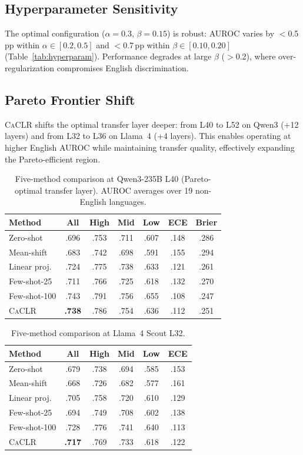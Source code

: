 \documentclass[11pt,a4paper]{article}
\newcommand{\caclr}{\textsc{CaCLR}}
\begin{document}
\subsection{Hyperparameter Sensitivity}

The optimal configuration ($\alpha = 0.3$, $\beta = 0.15$) is robust: AUROC varies by $<$0.5\,pp within $\alpha \in [0.2, 0.5]$ and $<$0.7\,pp within $\beta \in [0.10, 0.20]$ (Table~\ref{tab:hyperparam}).
Performance degrades at large $\beta$ ($>$0.2), where over-regularization compromises English discrimination.

\subsection{Pareto Frontier Shift}

\caclr{} shifts the optimal transfer layer deeper: from L40 to L52 on Qwen3 (+12 layers) and from L32 to L36 on Llama~4 (+4 layers).
This enables operating at higher English AUROC while maintaining transfer quality, effectively expanding the Pareto-efficient region.

\begin{table}[t]
\centering
\small
\caption{Five-method comparison at Qwen3-235B L40 (Pareto-optimal transfer layer). AUROC averages over 19 non-English languages.}
\label{tab:caclr_qwen3}
\begin{tabular}{lcccccc}
\toprule
Method & All & High & Mid & Low & ECE & Brier \\
\midrule
Zero-shot & .696 & .753 & .711 & .607 & .148 & .286 \\
Mean-shift & .683 & .742 & .698 & .591 & .155 & .294 \\
Linear proj. & .724 & .775 & .738 & .633 & .121 & .261 \\
Few-shot-25 & .711 & .766 & .725 & .618 & .132 & .270 \\
Few-shot-100 & .743 & .791 & .756 & .655 & .108 & .247 \\
\caclr{} & \textbf{.738} & .786 & .754 & .636 & .112 & .251 \\
\bottomrule
\end{tabular}
\end{table}

\begin{table}[t]
\centering
\small
\caption{Five-method comparison at Llama~4 Scout L32.}
\label{tab:caclr_llama4}
\begin{tabular}{lccccc}
\toprule
Method & All & High & Mid & Low & ECE \\
\midrule
Zero-shot & .679 & .738 & .694 & .585 & .153 \\
Mean-shift & .668 & .726 & .682 & .577 & .161 \\
Linear proj. & .705 & .758 & .720 & .610 & .129 \\
Few-shot-25 & .694 & .749 & .708 & .602 & .138 \\
Few-shot-100 & .728 & .776 & .741 & .640 & .113 \\
\caclr{} & \textbf{.717} & .769 & .733 & .618 & .122 \\
\bottomrule
\end{tabular}
\end{table}
\end{document}
